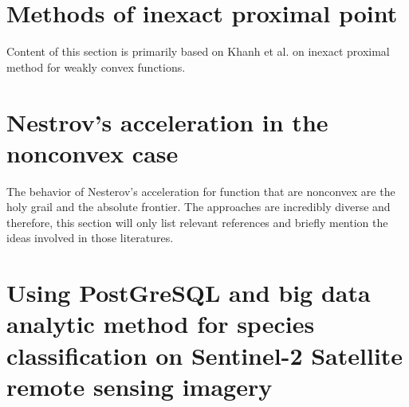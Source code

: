 \documentclass[12pt]{article}
\begin{document}
    
\section{Methods of inexact proximal point}\label{sec:inexact-prox}
    Content of this section is primarily based on Khanh et al. \cite{duy_khanh_inexact_2023} on inexact proximal method for weakly convex functions. 


\section{Nestrov's acceleration in the nonconvex case}\label{sec:nes-acc-ncnvx}
    The behavior of Nesterov's acceleration for function that are nonconvex are the holy grail and the absolute frontier. 
    The approaches are incredibly diverse and therefore, this section will only list relevant references and briefly mention the ideas involved in those literatures. 


\section{Using PostGreSQL and big data analytic method for species classification on Sentinel-2 Satellite remote sensing imagery}




\newpage

\appendix
\end{document}
